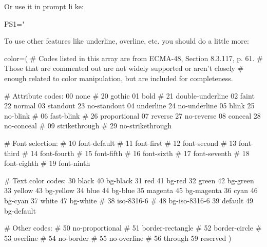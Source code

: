 Or use it in prompt li	ke:\newline
\begin{bashcode}
	PS1="%
\end{bashcode}

To use other features like underline, overline, etc. you should do a little more:\newline
\begin{bashcode}
local lc=$'\e[' rc=m	# Standard ANSI terminal escape 

echo $fg_bold[red] reza $fg_no_bold[red]shams "$lc"09";${color[white]}$rc" amiri $reset_color 
\end{bashcode}

\begin{bashcode}
	color=(
		# Codes listed in this array are from ECMA-48, Section 8.3.117, p. 61.
		# Those that are commented out are not widely supported or aren't closely
		# enough related to color manipulation, but are included for completeness.
		
		# Attribute codes:
		00 none                 # 20 gothic
		01 bold                 # 21 double-underline
		02 faint                  22 normal
		03 standout               23 no-standout
		04 underline              24 no-underline
		05 blink                  25 no-blink
		# 06 fast-blink           # 26 proportional
		07 reverse                27 no-reverse
		08 conceal                28 no-conceal
		# 09 strikethrough        # 29 no-strikethrough
		
		# Font selection:
		# 10 font-default
		# 11 font-first
		# 12 font-second
		# 13 font-third
		# 14 font-fourth
		# 15 font-fifth
		# 16 font-sixth
		# 17 font-seventh
		# 18 font-eighth
		# 19 font-ninth
		
		# Text color codes:
		30 black                  40 bg-black
		31 red                    41 bg-red
		32 green                  42 bg-green
		33 yellow                 43 bg-yellow
		34 blue                   44 bg-blue
		35 magenta                45 bg-magenta
		36 cyan                   46 bg-cyan
		37 white                  47 bg-white
		# 38 iso-8316-6           # 48 bg-iso-8316-6
		39 default                49 bg-default
		
		# Other codes:
		# 50 no-proportional
		# 51 border-rectangle
		# 52 border-circle
		# 53 overline
		# 54 no-border
		# 55 no-overline
		# 56 through 59 reserved
	)
\end{bashcode}

